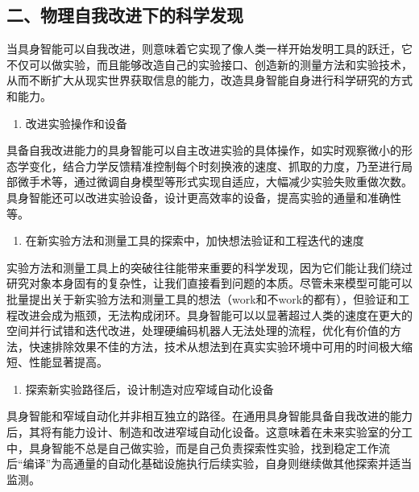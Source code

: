 \hypertarget{ux4e8cux7269ux7406ux81eaux6211ux6539ux8fdbux4e0bux7684ux79d1ux5b66ux53d1ux73b0}{%
\subsection{二、物理自我改进下的科学发现}\label{ux4e8cux7269ux7406ux81eaux6211ux6539ux8fdbux4e0bux7684ux79d1ux5b66ux53d1ux73b0}}

当具身智能可以自我改进，则意味着它实现了像人类一样开始发明工具的跃迁，它不仅可以做实验，而且能够改造自己的实验接口、创造新的测量方法和实验技术，从而不断扩大从现实世界获取信息的能力，改造具身智能自身进行科学研究的方式和能力。

\begin{enumerate}
\def\labelenumi{\arabic{enumi}.}
\tightlist
\item
  改进实验操作和设备
\end{enumerate}

具备自我改进能力的具身智能可以自主改进实验的具体操作，如实时观察微小的形态学变化，结合力学反馈精准控制每个时刻换液的速度、抓取的力度，乃至进行局部微手术等，通过微调自身模型等形式实现自适应，大幅减少实验失败重做次数。具身智能还可以改进实验设备，设计更高效率的设备，提高实验的通量和准确性等。

\begin{enumerate}
\def\labelenumi{\arabic{enumi}.}
\setcounter{enumi}{1}
\tightlist
\item
  在新实验方法和测量工具的探索中，加快想法验证和工程迭代的速度
\end{enumerate}

实验方法和测量工具上的突破往往能带来重要的科学发现，因为它们能让我们绕过研究对象本身固有的复杂性，让我们直接看到问题的本质。尽管未来模型可能可以批量提出关于新实验方法和测量工具的想法（work和不work的都有），但验证和工程改进会成为瓶颈，无法构成闭环。具身智能可以以显著超过人类的速度在更大的空间并行试错和迭代改进，处理硬编码机器人无法处理的流程，优化有价值的方法，快速排除效果不佳的方法，技术从想法到在真实实验环境中可用的时间极大缩短、性能显著提高。

\begin{enumerate}
\def\labelenumi{\arabic{enumi}.}
\setcounter{enumi}{2}
\tightlist
\item
  探索新实验路径后，设计制造对应窄域自动化设备
\end{enumerate}

具身智能和窄域自动化并非相互独立的路径。在通用具身智能具备自我改进的能力后，其将有能力设计、制造和改进窄域自动化设备。这意味着在未来实验室的分工中，具身智能不总是自己做实验，而是自己负责探索性实验，找到稳定工作流后``编译''为高通量的自动化基础设施执行后续实验，自身则继续做其他探索并适当监测。

